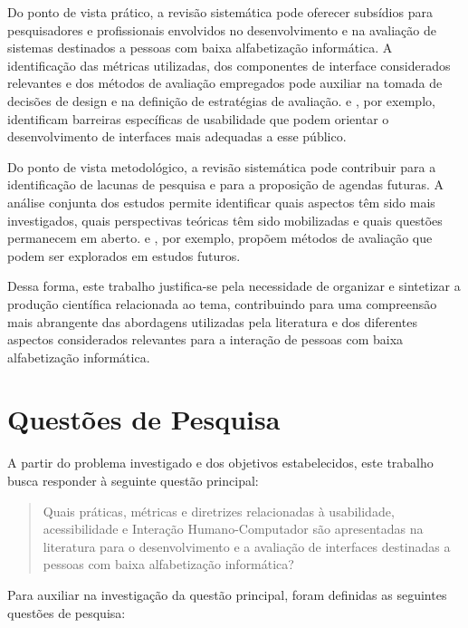 Do ponto de vista prático, a revisão sistemática pode oferecer subsídios para pesquisadores e profissionais envolvidos no desenvolvimento e na avaliação de sistemas destinados a pessoas com baixa alfabetização informática. A identificação das métricas utilizadas, dos componentes de interface considerados relevantes e dos métodos de avaliação empregados pode auxiliar na tomada de decisões de design e na definição de estratégias de avaliação. \cite{gatsou2017seniors} e \cite{barron2013feasibility}, por exemplo, identificam barreiras específicas de usabilidade que podem orientar o desenvolvimento de interfaces mais adequadas a esse público.

Do ponto de vista metodológico, a revisão sistemática pode contribuir para a identificação de lacunas de pesquisa e para a proposição de agendas futuras. A análise conjunta dos estudos permite identificar quais aspectos têm sido mais investigados, quais perspectivas teóricas têm sido mobilizadas e quais questões permanecem em aberto. \cite{filgueiras2009recoverability} e \cite{taylor2009using}, por exemplo, propõem métodos de avaliação que podem ser explorados em estudos futuros.

Dessa forma, este trabalho justifica-se pela necessidade de organizar e sintetizar a produção científica relacionada ao tema, contribuindo para uma compreensão mais abrangente das abordagens utilizadas pela literatura e dos diferentes aspectos considerados relevantes para a interação de pessoas com baixa alfabetização informática.

\section{Questões de Pesquisa}

A partir do problema investigado e dos objetivos estabelecidos, este trabalho busca responder à seguinte questão principal:

\begin{quote}
Quais práticas, métricas e diretrizes relacionadas à usabilidade, acessibilidade e Interação Humano-Computador são apresentadas na literatura para o desenvolvimento e a avaliação de interfaces destinadas a pessoas com baixa alfabetização informática?
\end{quote}

Para auxiliar na investigação da questão principal, foram definidas as seguintes questões de pesquisa:

